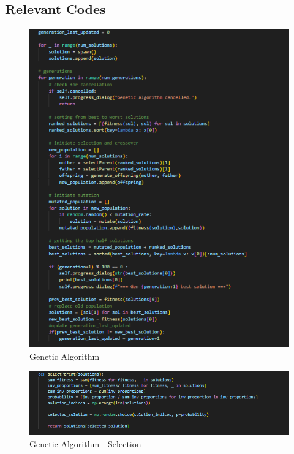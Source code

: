 \begin{appendices}
\begin{centerappendixtitle}
\begin{figure}[h]
\end{figure}
		
		
		
	\end{centerappendixtitle}
	
	\begin{centerappendixtitle}
		\chapter{Relevant Codes}
		\pagebreak
		
		\begin{figure}[h]
			\centering
			\caption{Genetic Algorithm}
			\label{genalgoCode}
			\includegraphics[width=\linewidth]{appendix/gen algo}
		\end{figure}
		
		\begin{figure}[h]
			\centering
			\caption{Genetic Algorithm - Selection}
			\label{selectionCode}
			\includegraphics[width=\linewidth]{appendix/selection}
		\end{figure}
		

\end{centerappendixtitle}
\end{appendices}
